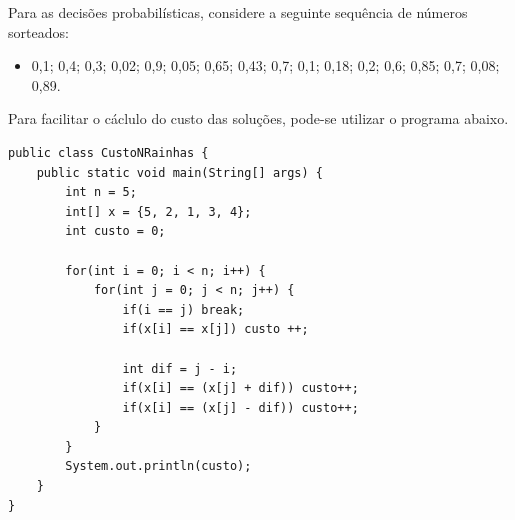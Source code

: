\begin{exercise}
\insertspace

Para as decisões probabilísticas, considere a seguinte sequência de números sorteados:
\begin{itemize}
	\item 0,1; 0,4; 0,3; 0,02; 0,9; 0,05; 0,65; 0,43; 0,7; 0,1; 0,18; 0,2; 0,6; 0,85; 0,7; 0,08; 0,89.
\end{itemize}

\insertspace

Para facilitar o cáclulo do custo das soluções, pode-se utilizar o programa abaixo.

\begin{verbatim}
public class CustoNRainhas {
	public static void main(String[] args) {
		int n = 5;
		int[] x = {5, 2, 1, 3, 4};
		int custo = 0;
		
		for(int i = 0; i < n; i++) {
			for(int j = 0; j < n; j++) {
				if(i == j) break;
				if(x[i] == x[j]) custo ++;
				
				int dif = j - i;
				if(x[i] == (x[j] + dif)) custo++;
				if(x[i] == (x[j] - dif)) custo++;
			}
		}   
		System.out.println(custo);
	}
}
\end{verbatim}

\end{exercise}

